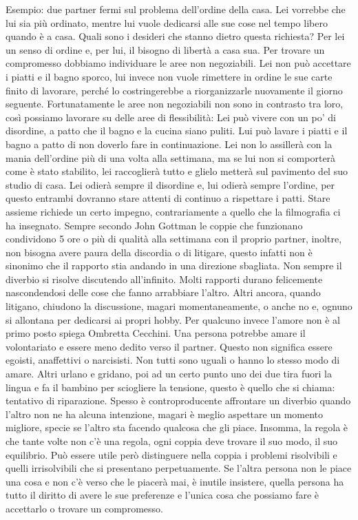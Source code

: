 \documentclass[12pt]{book} %
\begin{document}
Esempio: due partner fermi sul problema dell'ordine della casa. Lei vorrebbe che lui sia più ordinato,
mentre lui vuole dedicarsi alle sue cose nel tempo libero quando è a casa. Quali sono i desideri che stanno dietro
questa richiesta? Per lei un senso di ordine e, per lui, il bisogno di libertà a casa sua. Per trovare un compromesso
dobbiamo individuare le aree non negoziabili. Lei non può accettare i piatti e il bagno sporco, lui invece non vuole
rimettere in ordine le sue carte finito di lavorare, perché lo costringerebbe a riorganizzarle nuovamente il giorno
seguente. Fortunatamente le aree non negoziabili non sono in contrasto tra loro, così possiamo lavorare su delle aree
di flessibilità: Lei può vivere con un po' di disordine, a patto che il bagno e la cucina siano
puliti. Lui può lavare i piatti e il bagno a patto di non doverlo fare in continuazione. Lei non lo assillerà con la
mania dell'ordine più di una volta alla settimana, ma se lui non si comporterà come è stato
stabilito, lei raccoglierà tutto e glielo metterà sul pavimento del suo studio di casa. Lei odierà sempre il disordine
e, lui odierà sempre l'ordine, per questo entrambi dovranno stare attenti di continuo a rispettare
i patti. Stare assieme richiede un certo impegno, contrariamente a quello che la filmografia ci ha insegnato. Sempre secondo John Gottman le coppie che funzionano condividono 5 ore o più di qualità alla settimana con il proprio partner,
inoltre, non bisogna avere paura della discordia o di litigare, questo infatti non è sinonimo che il rapporto stia
andando in una direzione sbagliata. Non sempre il diverbio si risolve discutendo all'infinito.
Molti rapporti durano felicemente nascondendosi delle cose che fanno arrabbiare l'altro. Altri
ancora, quando litigano, chiudono la discussione, magari momentaneamente, o anche no e, ognuno si allontana per
dedicarsi ai propri hobby. Per qualcuno invece l'amore non è al primo posto spiega Ombretta
Cecchini. Una persona
potrebbe amare il volontariato e essere meno dedito verso il partner. Questo non significa essere egoisti, anaffettivi
o narcisisti. Non tutti sono uguali o hanno lo stesso modo di amare. Altri urlano e gridano, poi ad un certo punto uno
dei due tira fuori la lingua e fa il bambino per sciogliere la tensione, questo è quello che si chiama: tentativo di
riparazione. Spesso è controproducente affrontare un diverbio quando l'altro non ne ha alcuna
intenzione, magari è meglio aspettare un momento migliore, specie se l'altro sta facendo qualcosa
che gli piace. Insomma, la regola è che tante volte non c'è una regola, ogni coppia deve trovare
il suo modo, il suo equilibrio. Può essere utile però distinguere nella coppia i problemi risolvibili e quelli irrisolvibili che si presentano perpetuamente. Se l'altra persona non le piace una cosa e non c'è verso che le piacerà mai, è inutile insistere, quella persona ha tutto il diritto di avere le sue preferenze e l'unica cosa che possiamo fare è accettarlo o trovare un compromesso. 
\end{document}
